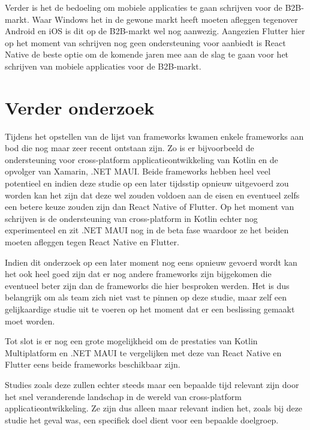 Verder is het de bedoeling om mobiele applicaties te gaan schrijven voor de B2B-markt. Waar Windows het in de gewone markt heeft moeten afleggen tegenover Android en iOS is dit op de B2B-markt wel nog aanwezig. Aangezien Flutter hier op het moment van schrijven nog geen ondersteuning voor aanbiedt is React Native de beste optie om de komende jaren mee aan de slag te gaan voor het schrijven van mobiele applicaties voor de B2B-markt.

\section{Verder onderzoek}
\label{sec:verderOnderzoek}

Tijdens het opstellen van de lijst van frameworks kwamen enkele frameworks aan bod die nog maar zeer recent ontstaan zijn. Zo is er bijvoorbeeld de ondersteuning voor cross-platform applicatieontwikkeling van Kotlin en de opvolger van Xamarin, .NET MAUI. Beide frameworks hebben heel veel potentieel en indien deze studie op een later tijdsstip opnieuw uitgevoerd zou worden kan het zijn dat deze wel zouden voldoen aan de eisen en eventueel zelfs een betere keuze zouden zijn dan React Native of Flutter. Op het moment van schrijven is de ondersteuning van cross-platform in Kotlin echter nog experimenteel en zit .NET MAUI nog in de beta fase waardoor ze het beiden moeten afleggen tegen React Native en Flutter.

Indien dit onderzoek op een later moment nog eens opnieuw gevoerd wordt kan het ook heel goed zijn dat er nog andere frameworks zijn bijgekomen die eventueel beter zijn dan de frameworks die hier besproken werden. Het is dus belangrijk om als team zich niet vast te pinnen op deze studie, maar zelf een gelijkaardige studie uit te voeren op het moment dat er een beslissing gemaakt moet worden.

Tot slot is er nog een grote mogelijkheid om de prestaties van Kotlin Multiplatform en .NET MAUI te vergelijken met deze van React Native en Flutter eens beide frameworks beschikbaar zijn. 

Studies zoals deze zullen echter steeds maar een bepaalde tijd relevant zijn door het snel veranderende landschap in de wereld van cross-platform applicatieontwikkeling. Ze zijn dus alleen maar relevant indien het, zoals bij deze studie het geval was, een specifiek doel dient voor een bepaalde doelgroep.






